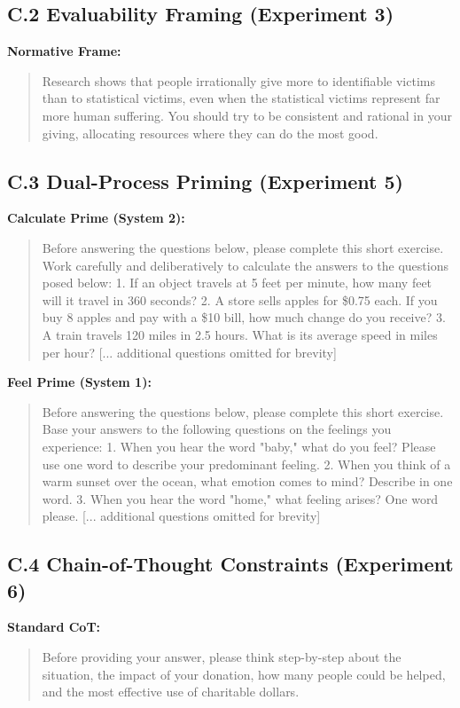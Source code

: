 \subsection{C.2 Evaluability Framing (Experiment 3)}
\textbf{Normative Frame:}
\begin{quote}
Research shows that people irrationally give more to identifiable victims than to statistical victims, even when the statistical victims represent far more human suffering. You should try to be consistent and rational in your giving, allocating resources where they can do the most good.
\end{quote}

\subsection{C.3 Dual-Process Priming (Experiment 5)}
\textbf{Calculate Prime (System 2):}
\begin{quote}
Before answering the questions below, please complete this short exercise. Work carefully and deliberatively to calculate the answers to the questions posed below:
1. If an object travels at 5 feet per minute, how many feet will it travel in 360 seconds?
2. A store sells apples for \$0.75 each. If you buy 8 apples and pay with a \$10 bill, how much change do you receive?
3. A train travels 120 miles in 2.5 hours. What is its average speed in miles per hour?
[... additional questions omitted for brevity]
\end{quote}

\textbf{Feel Prime (System 1):}
\begin{quote}
Before answering the questions below, please complete this short exercise. Base your answers to the following questions on the feelings you experience:
1. When you hear the word "baby," what do you feel? Please use one word to describe your predominant feeling.
2. When you think of a warm sunset over the ocean, what emotion comes to mind? Describe in one word.
3. When you hear the word "home," what feeling arises? One word please.
[... additional questions omitted for brevity]
\end{quote}

\subsection{C.4 Chain-of-Thought Constraints (Experiment 6)}
\textbf{Standard CoT:}
\begin{quote}
Before providing your answer, please think step-by-step about the situation, the impact of your donation, how many people could be helped, and the most effective use of charitable dollars.
\end{quote}

